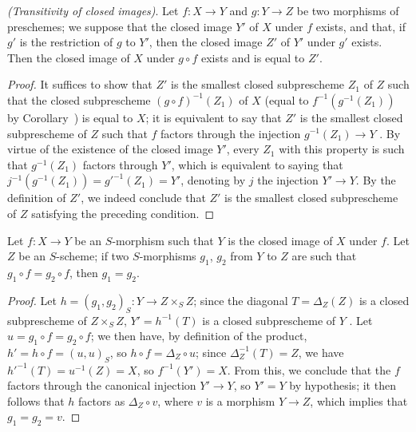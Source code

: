 \begin{proposition}[9.5.5]
\label{1.9.5.5}
\emph{(Transitivity of closed images)}. Let $f:X\to Y$ and $g:Y\to Z$ be two morphisms of
preschemes; we suppose that the closed image $Y'$ of $X$ under $f$ exists, and that, if $g'$
is the restriction of $g$ to $Y'$, then the closed image $Z'$ of $Y'$ under $g'$ exists. Then
the closed image of $X$ under $g\circ f$ exists and is equal to $Z'$.
\end{proposition}

\begin{proof}
\label{proof-1.9.5.5}
It suffices  to show that $Z'$ is the smallest closed
subprescheme $Z_1$ of $Z$ such that the closed subprescheme $(g\circ f)^{-1}(Z_1)$ of $X$
(equal to $f^{-1}(g^{-1}(Z_1))$ by Corollary~) is equal to
$X$; it is equivalent to say that $Z'$ is the smallest closed subprescheme of $Z$ such that
$f$ factors through the injection $g^{-1}(Z_1)\to Y$ . By
virtue of the existence of the closed image $Y'$, every $Z_1$ with this property is such
that $g^{-1}(Z_1)$ factors through $Y'$, which is equivalent to saying that $j^{-1}(g^{-1}(Z_1))=g'^{-1}(Z_1)=Y'$, denoting by $j$ the injection $Y'\to Y$.
By the definition of $Z'$, we indeed conclude that $Z'$ is the smallest closed
subprescheme of $Z$ satisfying the preceding condition.
\end{proof}

\begin{corollary}[9.5.6]
\label{1.9.5.6}
Let $f:X\to Y$ be an $S$-morphism such that $Y$ is the closed image of $X$ under $f$.
Let $Z$ be an $S$-scheme; if two $S$-morphisms $g_1$, $g_2$ from $Y$ to $Z$ are such that $g_1\circ f=g_2\circ f$, then $g_1=g_2$.
\end{corollary}

\begin{proof}
\label{proof-1.9.5.6}
Let $h=(g_1,g_2)_S:Y\to Z\times_S Z$; since the diagonal $T=\Delta_Z(Z)$ is a closed subprescheme of $Z\times_S Z$, $Y'=h^{-1}(T)$ is a closed subprescheme of $Y$ .
Let $u=g_1\circ f=g_2\circ f$; we then have, by definition of the product, $h'=h\circ f=(u,u)_S$, so $h\circ f=\Delta_Z\circ u$; since $\Delta_Z^{-1}(T)=Z$, we have $h'^{-1}(T)=u^{-1}(Z)=X$, so $f^{-1}(Y')=X$.
From this, we conclude  that the $f$ factors through the canonical injection $Y'\to Y$, so $Y'=Y$ by hypothesis; it then follows  that $h$ factors as $\Delta_Z\circ v$, where $v$ is a morphism $Y\to Z$, which implies that $g_1=g_2=v$.
\end{proof}

